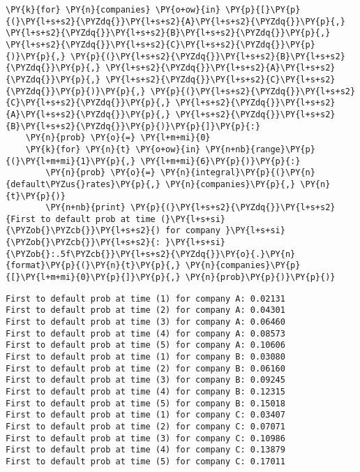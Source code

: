 \begin{tcolorbox}[breakable, size=fbox, boxrule=1pt, pad at break*=1mm,colback=cellbackground, colframe=cellborder]
\begin{Verbatim}[commandchars=\\\{\}]
\PY{k}{for} \PY{n}{companies} \PY{o+ow}{in} \PY{p}{[}\PY{p}{(}\PY{l+s+s2}{\PYZdq{}}\PY{l+s+s2}{A}\PY{l+s+s2}{\PYZdq{}}\PY{p}{,} \PY{l+s+s2}{\PYZdq{}}\PY{l+s+s2}{B}\PY{l+s+s2}{\PYZdq{}}\PY{p}{,} \PY{l+s+s2}{\PYZdq{}}\PY{l+s+s2}{C}\PY{l+s+s2}{\PYZdq{}}\PY{p}{)}\PY{p}{,} \PY{p}{(}\PY{l+s+s2}{\PYZdq{}}\PY{l+s+s2}{B}\PY{l+s+s2}{\PYZdq{}}\PY{p}{,} \PY{l+s+s2}{\PYZdq{}}\PY{l+s+s2}{A}\PY{l+s+s2}{\PYZdq{}}\PY{p}{,} \PY{l+s+s2}{\PYZdq{}}\PY{l+s+s2}{C}\PY{l+s+s2}{\PYZdq{}}\PY{p}{)}\PY{p}{,} \PY{p}{(}\PY{l+s+s2}{\PYZdq{}}\PY{l+s+s2}{C}\PY{l+s+s2}{\PYZdq{}}\PY{p}{,} \PY{l+s+s2}{\PYZdq{}}\PY{l+s+s2}{A}\PY{l+s+s2}{\PYZdq{}}\PY{p}{,} \PY{l+s+s2}{\PYZdq{}}\PY{l+s+s2}{B}\PY{l+s+s2}{\PYZdq{}}\PY{p}{)}\PY{p}{]}\PY{p}{:}
    \PY{n}{prob} \PY{o}{=} \PY{l+m+mi}{0}
    \PY{k}{for} \PY{n}{t} \PY{o+ow}{in} \PY{n+nb}{range}\PY{p}{(}\PY{l+m+mi}{1}\PY{p}{,} \PY{l+m+mi}{6}\PY{p}{)}\PY{p}{:}
        \PY{n}{prob} \PY{o}{=} \PY{n}{integral}\PY{p}{(}\PY{n}{default\PYZus{}rates}\PY{p}{,} \PY{n}{companies}\PY{p}{,} \PY{n}{t}\PY{p}{)}
        \PY{n+nb}{print} \PY{p}{(}\PY{l+s+s2}{\PYZdq{}}\PY{l+s+s2}{First to default prob at time (}\PY{l+s+si}{\PYZob{}\PYZcb{}}\PY{l+s+s2}{) for company }\PY{l+s+si}{\PYZob{}\PYZcb{}}\PY{l+s+s2}{: }\PY{l+s+si}{\PYZob{}:.5f\PYZcb{}}\PY{l+s+s2}{\PYZdq{}}\PY{o}{.}\PY{n}{format}\PY{p}{(}\PY{n}{t}\PY{p}{,} \PY{n}{companies}\PY{p}{[}\PY{l+m+mi}{0}\PY{p}{]}\PY{p}{,} \PY{n}{prob}\PY{p}{)}\PY{p}{)}
\end{Verbatim}
\end{tcolorbox}

    \begin{Verbatim}[commandchars=\\\{\}]
First to default prob at time (1) for company A: 0.02131
First to default prob at time (2) for company A: 0.04301
First to default prob at time (3) for company A: 0.06460
First to default prob at time (4) for company A: 0.08573
First to default prob at time (5) for company A: 0.10606
First to default prob at time (1) for company B: 0.03080
First to default prob at time (2) for company B: 0.06160
First to default prob at time (3) for company B: 0.09245
First to default prob at time (4) for company B: 0.12315
First to default prob at time (5) for company B: 0.15018
First to default prob at time (1) for company C: 0.03407
First to default prob at time (2) for company C: 0.07071
First to default prob at time (3) for company C: 0.10986
First to default prob at time (4) for company C: 0.13879
First to default prob at time (5) for company C: 0.17011
    \end{Verbatim}

